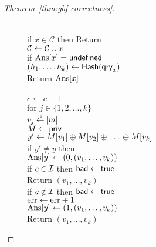 \begin{proof}[Theorem~\ref{thm:gbf-correctness}]
\begin{figure}[tp]
{{\\
if $x \in \mathcal{C}$ then Return $\bot$\\
${\cal C} \gets {\cal C} \cup x$\\
if $\mathrm{Ans}[x] = \mathsf{undefined}$\\
\nudge $(h_1, \ldots, h_{k}) \gets \mathsf{Hash}(\mathsf{qry}_x)$\\
Return $\mathrm{Ans}[x]$\\
}
{
\\
$c \gets c + 1$\\
for $j \in \{1,2,\ldots,k\}$\\
\nudge $v_j {\:\stackrel{{\scriptscriptstyle \hspace{0.2em}\$}} {\leftarrow}\:} [m]$\\
%
$M \gets{\sf priv}$\\
$y' \gets M[v_1] {\:\oplus\:} M[v_2] {\:\oplus\:} \ldots {\:\oplus\:} M[v_k]$\\
if $y' \neq y$ then \\
\nudge $\mathrm{Ans}[y] \gets (0, (v_1, \ldots, v_{k}) )$\\
\nudge if $c \in {\cal I}$ then $\mathsf{bad} \gets \mathsf{true}$\\
\nudge Return $\left(v_1,\ldots,v_k\right)$\\
if $c \notin {\cal I}$ then $\mathsf{bad} \gets \mathsf{true}$\\
$\mathrm{err} \gets \mathrm{err} +1$\\
$\mathrm{Ans}[y] \gets (1, (v_1, \ldots, v_{k}))$\\
Return $\left(v_1,\ldots,v_k\right)$
}
}
%
\end{figure}
\end{proof}
